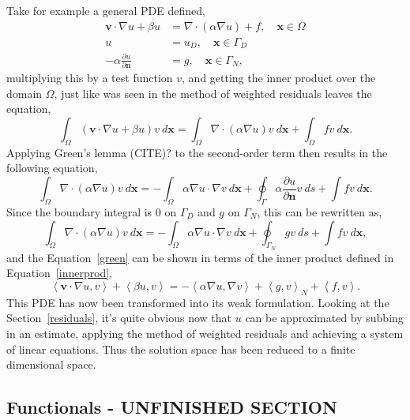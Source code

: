 Take for example a general PDE defined,
\begin{align}
	\mathbf{v}\cdot\nabla u + \beta u &= \nabla\cdot(\alpha\nabla u) + f,\quad  \mathbf{x} \in \Omega \\
	u &= u_D,\quad \mathbf{x} \in \Gamma_D\\
	-\alpha\frac{\partial u}{\partial \mathbf{n}} &= g,\quad \mathbf{x} \in \Gamma_N,
\end{align}
multiplying this by a test function $v$, and getting the inner product over the domain $\Omega$, just like was seen in the method of weighted residuals leaves the equation,
\begin{equation}\label{green}
		\int_{\Omega}(\mathbf{v}\cdot\nabla u + \beta u)v~d\mathbf{x} = \int_{\Omega}\nabla\cdot(\alpha\nabla u)v~d\mathbf{x} + \int_{\Omega}fv~d\mathbf{x}.
\end{equation}
Applying Green's lemma (CITE)? to the second-order term then results in the following equation,
\begin{equation}
	\int_{\Omega}\nabla\cdot(\alpha\nabla u)v~d\mathbf{x} = -\int_{\Omega}\alpha\nabla u\cdot \nabla v~d\mathbf{x} + \oint_{\Gamma} \alpha \frac{\partial u}{\partial \mathbf{n}} v~ds + \int fv~d\mathbf{x}.
\end{equation}
Since the boundary integral is $0$ on $\Gamma_D$ and $g$ on $\Gamma_N$, this can be rewritten as,
\begin{equation}
	\int_{\Omega}\nabla\cdot(\alpha\nabla u)v~d\mathbf{x} = -\int_{\Omega}\alpha\nabla u\cdot \nabla v~d\mathbf{x} + \oint_{\Gamma_N} gv~ds + \int fv~d\mathbf{x},
\end{equation}
and the Equation~\eqref{green} can be shown in terms of the inner product defined in Equation~\eqref{innerprod},
\begin{equation}\label{weak}
	\left\langle\mathbf{v}\cdot\nabla u,v\right\rangle + \left\langle\beta u,v\right\rangle = -\left\langle\alpha\nabla u, \nabla v\right\rangle + \left\langle g,v\right\rangle_N + \left\langle f,v\right\rangle.
\end{equation}
This PDE has now been transformed into its weak formulation. Looking at the Section~\ref{residuals}, it's quite obvious now that $u$ can be approximated by subbing in an estimate, applying the method of weighted residuals and achieving a system of linear equations. Thus the solution space has been reduced to a finite dimensional space.

\subsection{Functionals - UNFINISHED SECTION}\label{functionals}

